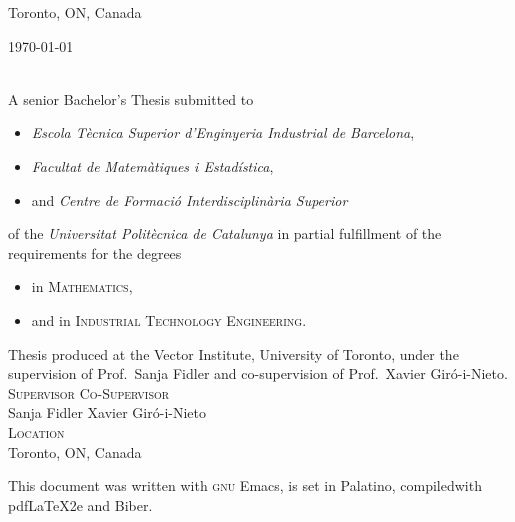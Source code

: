 \begin{titlepage}
  \vfill

  Toronto, ON, Canada \hfill \@date

  \makeatother
\end{titlepage}


\thispagestyle{plain}
\null
\vfill
\begin{sloppypar}
  \makeatletter
  \noindent \@author{} \textcopyright{} \today \\
  \texttt{\@title} \\
  \makeatother
\end{sloppypar}

\noindent A senior Bachelor's Thesis submitted to
\begin{itemize}
  \item \textsl{Escola Tècnica Superior d'Enginyeria Industrial de Barcelona},
  \item \textsl{Facultat de Matemàtiques i Estadística},
  \item and \textsl{Centre de Formació Interdisciplinària Superior}
\end{itemize}
of the \textit{Universitat Politècnica de Catalunya} in partial fulfillment of
the requirements for the degrees
\begin{itemize}
  \item in \textsc{Mathematics},
  \item and in \textsc{Industrial Technology Engineering}. \\
\end{itemize}

\noindent Thesis produced at the Vector Institute, University of Toronto, under
the supervision of Prof.\ Sanja Fidler and co-supervision of Prof.\ Xavier
Giró-i-Nieto. \\

\noindent \textsc{Supervisor} \hfill \textsc{Co-Supervisor} \\
Sanja Fidler \hfill Xavier Giró-i-Nieto \\

\noindent \textsc{Location} \\
Toronto, ON, Canada \\

\doclicenseThis









This document was written with \textsc{gnu} Emacs, is set in Palatino,
compiledwith pdf\LaTeX{}2e and Biber.

